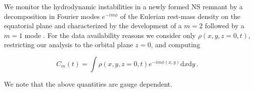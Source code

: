 We monitor the hydrodynamic instabilities in a newly formed \ac{NS} remnant 
by a decomposition in Fourier modes
$e^{- i m \phi}$ of the Eulerian rest-mass density on the equatorial plane 
\citep[see Eq.~(1) in][]{Radice:2016gym} and characterized by the
development of a $m=2$ followed by a $m=1$ mode 
\citep{East:2015vix,
    Paschalidis:2015mla,Radice:2016gym,Lehner:2016wjg,
    Bernuzzi:2013rza,Kastaun:2014fna}.
%
%
%
%
For the data availability reasons we consider only $\rho(x,y,z=0,t)$, 
\ie{} restricting our analysis to the orbital plane $z=0$, and computing 

\begin{equation}
\label{eq:modes}
C_m(t) = \int \rho(x,y,z=0,t) e^{-i m \phi(x,y)} \text{d}x \text{d} y \, .
\end{equation}

%
We note that the above quantities are gauge dependent.
%
%


